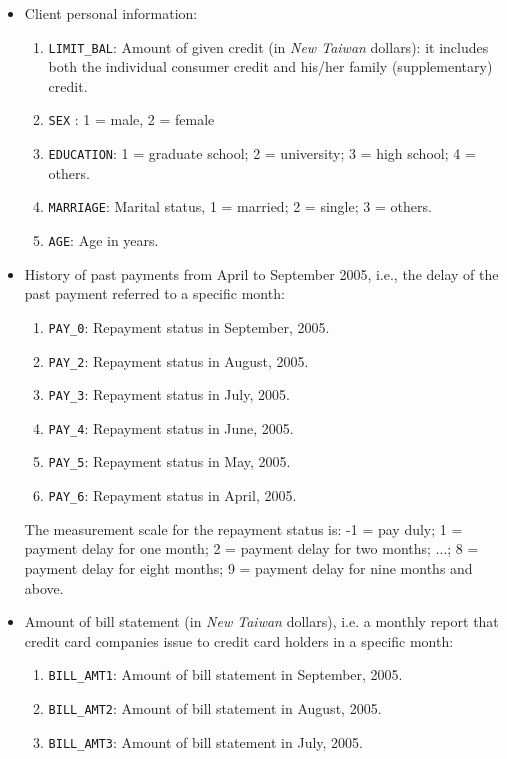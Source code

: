 \documentclass{article}
\begin{document}
\begin{itemize}
    \item Client personal information:
    \begin{enumerate}
        \item \texttt{LIMIT\_BAL}: Amount of given credit (in \textit{New Taiwan} dollars): it includes both the individual consumer credit and his/her family (supplementary) credit.
        \item \texttt{SEX} : 1 = male, 2 = female
        \item \texttt{EDUCATION}: 1 = graduate school; 2 = university; 3 = high school; 4 = others.
        \item \texttt{MARRIAGE}: Marital status, 1 = married; 2 = single; 3 = others.
        \item \texttt{AGE}: Age in years.
    \end{enumerate}
    \item History of past payments from April to September 2005, i.e., the delay of the past payment referred to a specific month:
    \begin{enumerate}[resume]
        \item \texttt{PAY\_0}: Repayment status in September, 2005.
        \item \texttt{PAY\_2}: Repayment status in August, 2005.
        \item \texttt{PAY\_3}: Repayment status in July, 2005.
        \item \texttt{PAY\_4}: Repayment status in June, 2005.
        \item \texttt{PAY\_5}: Repayment status in May, 2005.
        \item \texttt{PAY\_6}: Repayment status in April, 2005.
    \end{enumerate}
    The measurement scale for the repayment status is: -1 = pay duly; 1 = payment delay for one month; 2 = payment delay for two months; ...; 8 = payment delay for eight months; 9 = payment delay for nine months and above.
    \item Amount of bill statement (in \textit{New Taiwan} dollars), i.e. a monthly report that credit card companies issue to credit card holders in a specific month:
     \begin{enumerate}[resume]
        \item \texttt{BILL\_AMT1}: Amount of bill statement in September, 2005.
        \item \texttt{BILL\_AMT2}: Amount of bill statement in August, 2005.
        \item \texttt{BILL\_AMT3}: Amount of bill statement in July, 2005.

\end{enumerate}
\end{itemize}
\end{document}
